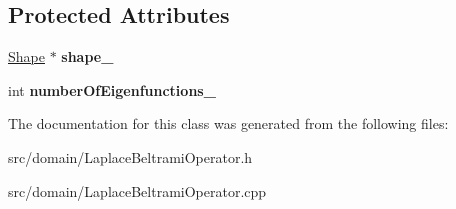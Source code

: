 \subsection*{Protected Attributes}
\begin{DoxyCompactItemize}
\item 
\hypertarget{class_laplace_beltrami_operator_a76971e7079a1ff8b73e163406ac32ee7}{}\hyperlink{class_shape}{Shape} $\ast$ {\bfseries shape\+\_\+}\label{class_laplace_beltrami_operator_a76971e7079a1ff8b73e163406ac32ee7}

\item 
\hypertarget{class_laplace_beltrami_operator_a0e281e6ac8c0d72305f0c237e71b7d99}{}int {\bfseries number\+Of\+Eigenfunctions\+\_\+}\label{class_laplace_beltrami_operator_a0e281e6ac8c0d72305f0c237e71b7d99}

\end{DoxyCompactItemize}


The documentation for this class was generated from the following files\+:\begin{DoxyCompactItemize}
\item 
src/domain/Laplace\+Beltrami\+Operator.\+h\item 
src/domain/Laplace\+Beltrami\+Operator.\+cpp\end{DoxyCompactItemize}
